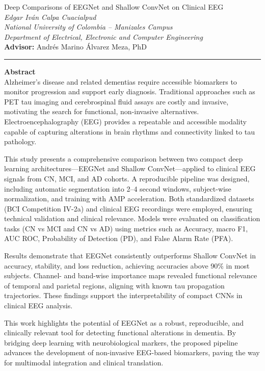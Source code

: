 \documentclass[12pt,a4paper]{article}
\renewenvironment{abstract}{
    \begin{flushleft}
    \noindent\textbf{Abstract}\\
}{
    \end{flushleft}
}
\begin{document}
\thispagestyle{empty}

\begin{center}
    {\LARGE Deep Comparisons of EEGNet and Shallow ConvNet on Clinical EEG}\\[3em]
    {\large \textit{Edgar Iván Calpa Cuacialpud}}\\
    {\normalsize \textit{National University of Colombia – Manizales Campus}}\\
    {\normalsize \textit{Department of Electrical, Electronic and Computer Engineering}}\\[3em]
    {\normalsize \textbf{Advisor:} Andrés Marino Álvarez Meza, PhD}\\
\end{center}

\hrule
\vspace{0cm}

  
\begin{abstract}
Alzheimer’s disease and related dementias require accessible biomarkers to monitor progression and support early diagnosis. Traditional approaches such as PET tau imaging and cerebrospinal fluid assays are costly and invasive, motivating the search for functional, non-invasive alternatives. Electroencephalography (EEG) provides a repeatable and accessible modality capable of capturing alterations in brain rhythms and connectivity linked to tau pathology. 

This study presents a comprehensive comparison between two compact deep learning architectures—EEGNet and Shallow ConvNet—applied to clinical EEG signals from CN, MCI, and AD cohorts. A reproducible pipeline was designed, including automatic segmentation into 2–4 second windows, subject-wise normalization, and training with AMP acceleration. Both standardized datasets (BCI Competition IV-2a) and clinical EEG recordings were employed, ensuring technical validation and clinical relevance. Models were evaluated on classification tasks (CN vs MCI and CN vs AD) using metrics such as Accuracy, macro F1, AUC ROC, Probability of Detection (PD), and False Alarm Rate (PFA). 

Results demonstrate that EEGNet consistently outperforms Shallow ConvNet in accuracy, stability, and loss reduction, achieving accuracies above 90\% in most subjects. Channel- and band-wise importance maps revealed functional relevance of temporal and parietal regions, aligning with known tau propagation trajectories. These findings support the interpretability of compact CNNs in clinical EEG analysis. 

This work highlights the potential of EEGNet as a robust, reproducible, and clinically relevant tool for detecting functional alterations in dementia. By bridging deep learning with neurobiological markers, the proposed pipeline advances the development of non-invasive EEG-based biomarkers, paving the way for multimodal integration and clinical translation.
\end{abstract}
\end{document}
